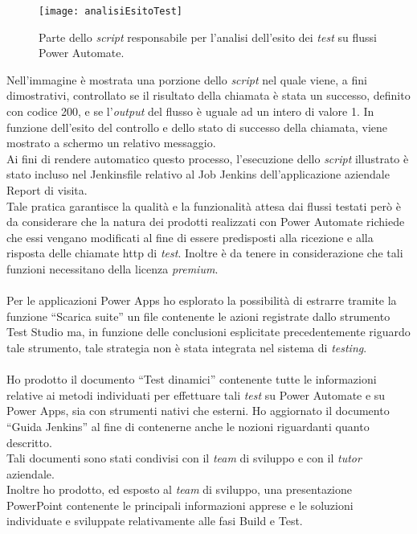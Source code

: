 \begin{figure}[htbp] 
    \centering 
    \texttt{[image: analisiEsitoTest]} 
    \caption{Parte dello \emph{script} responsabile per l'analisi dell'esito dei \emph{test} su flussi Power Automate.}
    \label{fig:analisiEsitoTest}
\end{figure}
\newline Nell'immagine è mostrata una porzione dello \emph{script} nel quale viene, a fini dimostrativi, controllato se il risultato della chiamata è stata un successo, definito con codice 200, e se l'\emph{output} del flusso è uguale ad un intero di valore 1. In funzione dell'esito del controllo e dello stato di successo della chiamata, viene mostrato a schermo un relativo messaggio.\\
Ai fini di rendere automatico questo processo, l'esecuzione dello \emph{script} illustrato è stato incluso nel Jenkinsfile relativo al Job Jenkins dell'applicazione aziendale Report di visita.\\
Tale pratica garantisce la qualità e la funzionalità attesa dai flussi testati però è da considerare che la natura dei prodotti realizzati con Power Automate richiede che essi vengano modificati al fine di essere predisposti alla ricezione e alla risposta delle chiamate \gls{http} di \emph{test}. Inoltre è da tenere in considerazione che tali funzioni necessitano della licenza \emph{premium}.\\\\
Per le applicazioni Power Apps ho esplorato la possibilità di estrarre tramite la funzione “Scarica suite” un file contenente le azioni registrate dallo strumento Test Studio ma, in funzione delle conclusioni esplicitate precedentemente riguardo tale strumento, tale strategia non è stata integrata nel sistema di \emph{testing}.\\\\
Ho prodotto il documento “Test dinamici” contenente tutte le informazioni relative ai metodi individuati per effettuare tali \emph{test} su Power Automate e su Power Apps, sia con strumenti nativi che esterni. Ho aggiornato il documento “Guida Jenkins” al fine di contenerne anche le nozioni riguardanti quanto descritto.\\
Tali documenti sono stati condivisi con il \emph{team} di sviluppo e con il \emph{tutor} aziendale.\\
Inoltre ho prodotto, ed esposto al \emph{team} di sviluppo, una presentazione PowerPoint contenente le principali informazioni apprese e le soluzioni individuate e sviluppate relativamente alle fasi Build e Test. 

